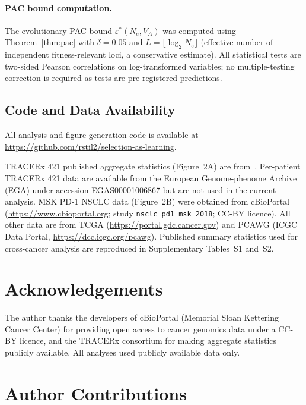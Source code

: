 \documentclass[12pt]{article}
\theoremstyle{remark}
\begin{document}
\paragraph{PAC bound computation.} The evolutionary PAC bound $\varepsilon^*(N_e, V_A)$ was computed using Theorem~\ref{thm:pac} with $\delta = 0.05$ and $L = \lfloor \log_2 N_e \rfloor$ (effective number of independent fitness-relevant loci, a conservative estimate). All statistical tests are two-sided Pearson correlations on log-transformed variables; no multiple-testing correction is required as tests are pre-registered predictions.

\subsection{Code and Data Availability}

All analysis and figure-generation code is available at \url{https://github.com/rstil2/selection-as-learning}.

TRACERx 421 published aggregate statistics (Figure~2A) are from~\cite{abbosh2023}. Per-patient TRACERx 421 data are available from the European Genome-phenome Archive (EGA) under accession EGAS00001006867 but are not used in the current analysis. MSK PD-1 NSCLC data (Figure~2B) were obtained from cBioPortal (\url{https://www.cbioportal.org}; study \texttt{nsclc\_pd1\_msk\_2018}; CC-BY licence). All other data are from TCGA (\url{https://portal.gdc.cancer.gov}) and PCAWG (ICGC Data Portal, \url{https://dcc.icgc.org/pcawg}). Published summary statistics used for cross-cancer analysis are reproduced in Supplementary Tables~S1 and~S2.

\section*{Acknowledgements}

The author thanks the developers of cBioPortal (Memorial Sloan Kettering Cancer Center) for providing open access to cancer genomics data under a CC-BY licence, and the TRACERx consortium for making aggregate statistics publicly available. All analyses used publicly available data only.

\section*{Author Contributions}
\end{document}
